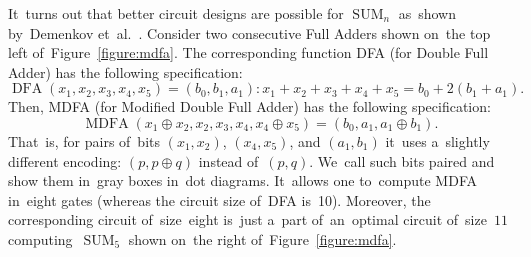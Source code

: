\documentclass[a4paper, UKenglish, cleveref, autoref,  thm-restate]{lipics-v2021}
\DeclareMathOperator{\SUM}{SUM}
\DeclareMathOperator{\MDFA}{MDFA}
\begin{document}
    It~turns out that better circuit designs are possible for $\SUM_n$
    as~shown by~Demenkov et~al.~\cite{DBLP:journals/ipl/DemenkovKKY10}.
    Consider two consecutive Full Adders shown on~the top left of~Figure~\ref{figure:mdfa}. The corresponding function DFA (for Double Full Adder) has the following specification: \[\operatorname{DFA}(x_1, x_2,x_3,x_4,x_5)=(b_0,b_1,a_1) \colon x_1+x_2+x_3+x_4+x_5=b_0+2(b_1+a_1).\]
    Then, MDFA (for Modified Double Full Adder) has the following specification:
    \[\MDFA(x_1 \oplus x_2, x_2, x_3, x_4, x_4 \oplus x_5)=(b_0, a_1, a_1 \oplus b_1).\]
    That~is, for pairs of~bits $(x_1, x_2)$, $(x_4, x_5)$, and $(a_1, b_1)$
    it~uses a~slightly different encoding: $(p, p \oplus q)$ instead of~$(p,q)$.
    We~call such bits paired and show them in~gray boxes in~dot diagrams.
    It~allows one to~compute MDFA in~eight gates (whereas the circuit size of~DFA is~10). Moreover, the corresponding circuit of~size~eight is~just a~part
    of~an~optimal circuit of~size~$11$ computing~$\SUM_5$ shown on~the right
    of~Figure~\ref{figure:mdfa}.
\end{document}
